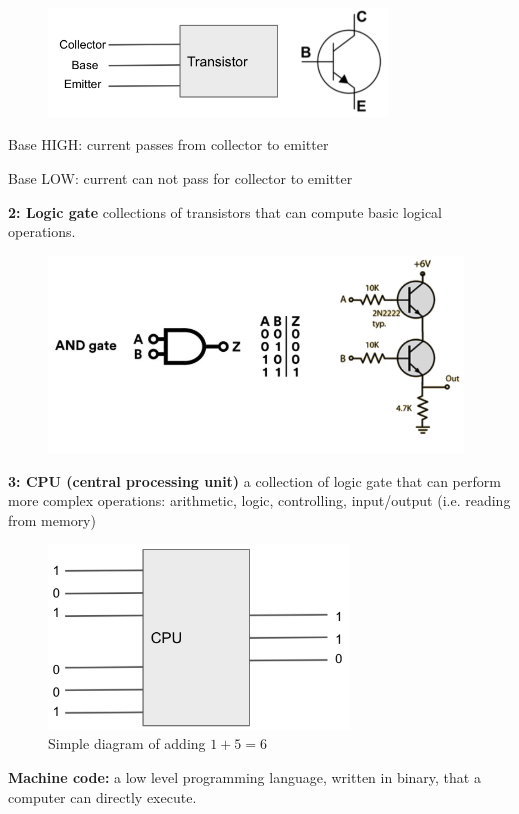 \documentclass[12pt]{article}
\numberwithin{equation}{section}
\begin{document}
\begin{figure}[H]
	\centering
	\includegraphics[width=9cm] {tran.png}
\end{figure}
Base HIGH: current passes from collector to emitter

Base LOW: current can not pass for collector to emitter

\textbf{2: Logic gate} collections of transistors that can compute basic logical operations. 

\begin{figure}[H]
	\centering
	\includegraphics[width=11cm] {and.png}
\end{figure}

\textbf{3: CPU (central processing unit)} a collection of logic gate that can perform more complex operations: arithmetic, logic, controlling, input/output (i.e. reading from memory)

\begin{figure}[H]
	\centering
	\includegraphics[width=8cm] {add.png}
	\caption{Simple diagram of adding $1+5=6$}
\end{figure}

\textbf{Machine code: }a low level programming language, written in binary, that a computer can directly execute. 
\end{document}
